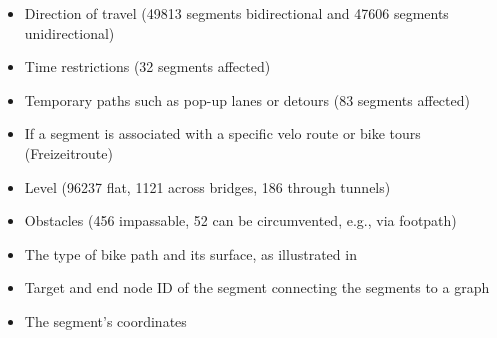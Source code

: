 \begin{itemize}
    \item Direction of travel (49813 segments bidirectional and 47606 segments unidirectional)
    \item Time restrictions (32 segments affected)
    \item Temporary paths such as pop-up lanes or detours (83 segments affected)
    \item If a segment is associated with a specific velo route or bike tours (Freizeitroute)
    \item Level (96237 flat, 1121 across bridges, 186 through tunnels)
    \item Obstacles (456 impassable, 52 can be circumvented, e.g., via footpath)
    \item The type of bike path and its surface, as illustrated in 
    \item Target and end node ID of the segment connecting the segments to a graph
    \item The segment's coordinates
\end{itemize}

